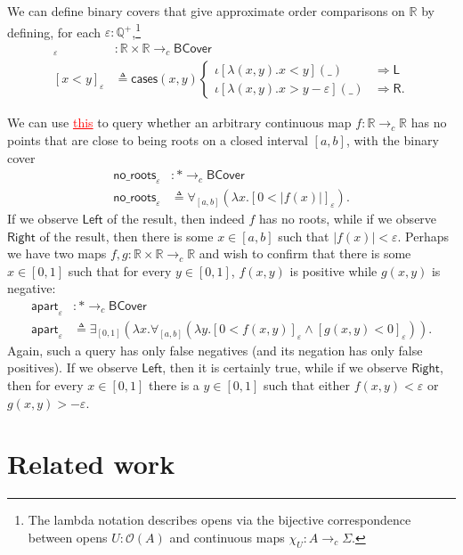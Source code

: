 \documentclass[conference]{IEEEtran}
\newcommand{\cto}{\to_c}
\newcommand{\R}{\mathbb{R}}
\newcommand{\rat}{\mathbb{Q}}
\newcommand{\One}{\ast}
\newcommand{\Open}[1]{\mathcal{O}({#1})}
\newcommand{\wildcard}{\_}
\newcommand{\oinclf}[1]{\iota[{#1}]}
\newcommand{\oincl}[2]{\oinclf{#1} \left({#2}\right)}
\newcommand{\Branch}{\Rightarrow}
\newcommand{\BCover}{\mathsf{BCover}}
\newcommand{\grammar}[1]{\textcolor{red}{\underline{#1}}}
\begin{document}
We can define binary covers that give approximate order comparisons on $\R$ by defining, for each $\varepsilon : \rat^+$,\footnote{The lambda notation describes opens via the bijective correspondence between opens $U : \Open{A}$ and continuous maps $\chi_U : A \cto \Sigma$.}
\begin{align*}
[ \cdot < \cdot ]_\varepsilon &: \R \times \R \cto \BCover
\\ [x < y]_\varepsilon &\triangleq \mathsf{cases}(x, y)
\begin{cases}
\oincl{\lambda (x, y). x < y}{\wildcard} &\Branch \mathsf{L}
\\ \oincl{\lambda (x, y). x > y - \varepsilon}{\wildcard} &\Branch \mathsf{R}.
\end{cases}
\end{align*}

We can use \grammar{this} to query whether an arbitrary continuous map $f : \R \cto \R$ has no points that are close to being roots on a closed interval $[a, b]$, with the binary cover
\begin{align*}
\mathsf{no\_roots}_{\varepsilon} &: \One \cto \BCover
\\ \mathsf{no\_roots}_\varepsilon &\triangleq
  \forall_{[a,b]}(\lambda x. [ 0 < |f(x)| ]_\varepsilon).
\end{align*}
If we observe $\mathsf{Left}$ of the result, then indeed $f$ has no roots, while if we observe $\mathsf{Right}$ of the result, then there is some $x \in [a, b]$ such that $|f(x)| < \varepsilon$. Perhaps we have two maps $f, g : \R \times \R \cto \R$ and wish to confirm that there is some $x \in [0,1]$ such that for every $y \in [0,1]$, $f(x, y)$ is positive while $g(x,y)$ is negative:
\begin{align*}
\mathsf{apart}_{\varepsilon} &: \One \cto \BCover
\\ \mathsf{apart}_\varepsilon &\triangleq
  \exists_{[0,1]}(\lambda x. \forall_{[a,b]}(\lambda y. [ 0 < f(x, y) ]_\varepsilon \wedge [g(x, y) < 0]_\varepsilon)).
\end{align*}
Again, such a query has only false negatives (and its negation has only false positives). If we observe $\mathsf{Left}$, then it is certainly true, while if we observe $\mathsf{Right}$, then for every $x \in [0,1]$ there is a $y \in [0,1]$ such that either $f(x, y) < \varepsilon$ or $g(x, y) > -\varepsilon$.

\section{Related work}
\end{document}
